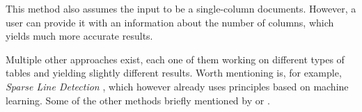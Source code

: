 This method also assumes the input to be a single-column documents. However, a user can provide it with an information about the number of columns, which yields much more accurate results.

Multiple other approaches exist, each one of them working on different types of tables and yielding slightly different results. Worth mentioning is, for example, \emph{Sparse Line Detection} \cite{sparseLineDetection}, which however already uses principles based on machine learning. Some of the other methods briefly mentioned by \citet{otherDetection1} or \citet{otherDetection2}.

